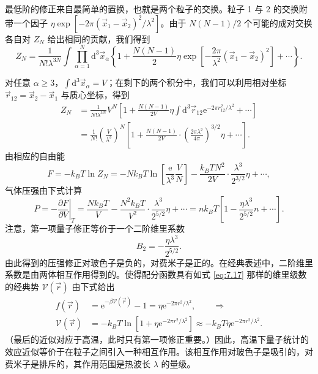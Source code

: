 最低阶的修正来自最简单的置换，也就是两个粒子的交换。粒子 1 与 2 的交换附带一个因子 $\eta\exp[-2\pi(\vec x_1-\vec x_2)^2/\lambda^2]$。由于 $N(N-1)/2$ 个可能的成对交换各自对 $Z_N$ 给出相同的贡献，我们得到
\begin{equation}\label{eq:7.17}
Z_N=\frac1{N!\lambda^{3N}}\int\prod_{\alpha=1}^N\mathrm d^3\vec x_\alpha\left\{1+\frac{N(N-1)}2\eta\exp\left[-\frac{2\pi}{\lambda^2}(\vec x_1-\vec x_2)^2\right]+\cdots\right\}.
\end{equation}


对任意 $\alpha\ge3$，$\int\mathrm d^3\vec x_\alpha=V$；在剩下的两个积分中，我们可以利用相对坐标 $\vec r_{12}=\vec x_2-\vec x_1$ 与质心坐标，得到
\begin{equation}\label{eq:7.18}
\begin{aligned}
Z_N&=\frac1{N!\lambda^{3N}}V^N\left[1+\frac{N(N-1)}{2V}\eta\int\mathrm d^3\vec r_{12}\mathrm e^{-2\pi r_{12}^2/\lambda^2}+\cdots\right]\\
&=\frac1{N!}\left(\frac V{\lambda^3}\right)^N\left[1+\frac{N(N-1)}{2V}\cdot\left(\frac{2\pi\lambda^2}{4\pi}\right)^{3/2}\eta+\cdots\right].
\end{aligned}
\end{equation}
由相应的自由能
\begin{equation}\label{eq:7.19}
F=-k_BT\ln Z_N=-Nk_BT\ln\left[\frac{\mathrm e}{\lambda^3}\frac VN\right]-\frac{k_BTN^2}{2V}\cdot\frac{\lambda^3}{2^{3/2}}\eta+\cdots,
\end{equation}
气体压强由下式计算
\begin{equation}\label{eq:7.20}
P=-\left.\frac{\partial F}{\partial V}\right|_T=\frac{Nk_BT}V-\frac{N^2k_BT}{V^2}\cdot\frac{\lambda^3}{2^{5/2}}\eta+\cdots=nk_BT\left[1-\frac{\eta\lambda^3}{2^{5/2}}n+\cdots\right].
\end{equation}
注意，第一项量子修正等价于一个二阶维里系数
\begin{equation}\label{eq:7.21}
B_2=-\frac{\eta\lambda^3}{2^{5/2}}.
\end{equation}
由此得到的压强修正对玻色子是负的，对费米子是正的。在经典表述中，二阶维里系数是由两体相互作用得到的。使得配分函数具有如式 \eqref{eq:7.17} 那样的维里级数的经典势 $\mathcal V(\vec r)$ 由下式给出
\begin{equation}\label{eq:7.22}
\begin{aligned}
f(\vec r)&=\mathrm e^{-\beta\mathcal V(\vec r)}-1=\eta\mathrm e^{-2\pi r^2/\lambda^2},\qquad\Longrightarrow\\
\mathcal V(\vec r)&=-k_BT\ln\left[1+\eta\mathrm e^{-2\pi r^2/\lambda^2}\right]\approx-k_BT\eta\mathrm e^{-2\pi r^2/\lambda^2}.
\end{aligned}
\end{equation}
（最后的近似对应于高温，此时只有第一项修正重要。）因此，高温下量子统计的效应近似等价于在粒子之间引入一种相互作用。该相互作用对玻色子是吸引的，对费米子是排斥的，其作用范围是热波长 $\lambda$ 的量级。

